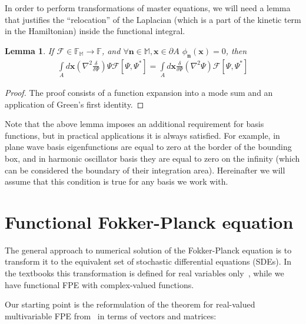\documentclass[12pt,aip,jmp,amssymb,amsmath]{revtex4-1}
\newtheorem{lemma}{Lemma}
\begin{document}
In order to perform transformations of master equations, we will need a lemma that justifies the ``relocation'' of the Laplacian (which is a part of the kinetic term in the Hamiltonian) inside the functional integral.

\begin{lemma}
\label{lmm:func-calculus:move-laplacian}
    If $\mathcal{F} \in \mathbb{F}_{\mathbb{M}} \rightarrow \mathbb{F}$, and $\forall \boldsymbol{n} \in \mathbb{M}, \boldsymbol{x} \in \partial A$ $\phi_{\boldsymbol{n}}(\boldsymbol{x}) = 0$, then
    \begin{eqnarray*}
        \int\limits_A d\boldsymbol{x} \left(
            \nabla^2 \frac{\delta}{\delta \Psi}
        \right) \Psi \mathcal{F}[\Psi, \Psi^*]
        = \int\limits_A d\boldsymbol{x} \frac{\delta}{\delta \Psi}
        ( \nabla^2 \Psi ) \mathcal{F}[\Psi, \Psi^*]
    \end{eqnarray*}
\end{lemma}
\begin{proof}
The proof consists of a function expansion into a mode sum and an application of Green's first identity.
\end{proof}

Note that the above lemma imposes an additional requirement for basis functions, but in practical applications it is always satisfied.
For example, in plane wave basis eigenfunctions are equal to zero at the border of the bounding box, and in harmonic oscillator basis they are equal to zero on the infinity (which can be considered the boundary of their integration area).
Hereinafter we will assume that this condition is true for any basis we work with.



\section{Functional Fokker-Planck equation}

The general approach to numerical solution of the Fokker-Planck equation is to transform it to the equivalent set of stochastic differential equations (SDEs).
In the textbooks this transformation is defined for real variables only~\cite{Risken1996}, while we have functional FPE with complex-valued functions.

Our starting point is the reformulation of the theorem for real-valued multivariable FPE from~\cite{Risken1996} in terms of vectors and matrices:
\end{document}
